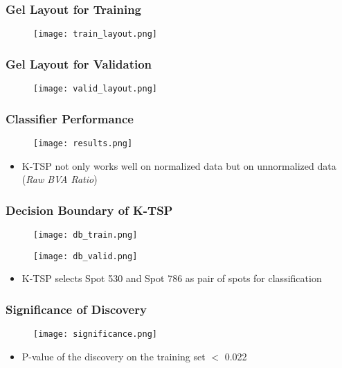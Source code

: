 \documentclass{beamer}
\begin{document}
\begin{frame}
\frametitle{Gel Layout for Training}
\begin{figure}
\texttt{[image: train\_layout.png]}
\end{figure}
\end{frame}

\begin{frame}
\frametitle{Gel Layout for Validation}
\begin{figure}
\texttt{[image: valid\_layout.png]}
\end{figure}
\end{frame}

\begin{frame}
\frametitle{Classifier Performance}
\begin{figure}
\texttt{[image: results.png]}
\end{figure}
\begin{itemize}
\item K-TSP not only works well on normalized data but on unnormalized data (\textit{Raw BVA Ratio})
\end{itemize}
\end{frame}

\begin{frame}
\frametitle{Decision Boundary of K-TSP}
\begin{figure}
  \begin{minipage}{.45\textwidth}
  	\texttt{[image: db\_train.png]}
  \end{minipage}
  \begin{minipage}{.45\textwidth}
  	\texttt{[image: db\_valid.png]}
  \end{minipage}
\end{figure}
\begin{itemize}
\item K-TSP selects Spot 530 and Spot 786 as pair of spots for classification
\end{itemize}
\end{frame}

\begin{frame}
\frametitle{Significance of Discovery}
\begin{figure}
\texttt{[image: significance.png]}
\end{figure}
\begin{itemize}
\item P-value of the discovery on the training set $<$ 0.022
\end{itemize}
\end{frame}
\end{document}
